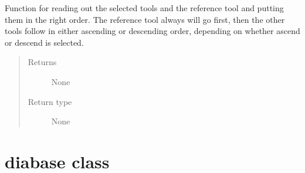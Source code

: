 \documentclass[letterpaper,10pt,english]{sphinxmanual}
\begin{document}
\begin{fulllineitems}

\begin{fulllineitems}
\label{\detokenize{index:app.MainWindow.update_tool_list}}
\sphinxAtStartPar
Function for reading out the selected tools and the reference tool and putting them in the right order. The reference tool always will go first, then the other tools follow in either ascending or descending order, depending on whether ascend or descend is selected.
\begin{quote}\begin{description}
\item[{Returns}] \leavevmode
\sphinxAtStartPar
None

\item[{Return type}] \leavevmode
\sphinxAtStartPar
None

\end{description}\end{quote}

\end{fulllineitems}


\end{fulllineitems}


\begin{fulllineitems}
\label{\detokenize{index:app.main}}
\end{fulllineitems}



\chapter{diabase class}
\label{\detokenize{index:module-diabase}}\label{\detokenize{index:diabase-class}}\label{\detokenize{index:module-1}}
\end{document}

